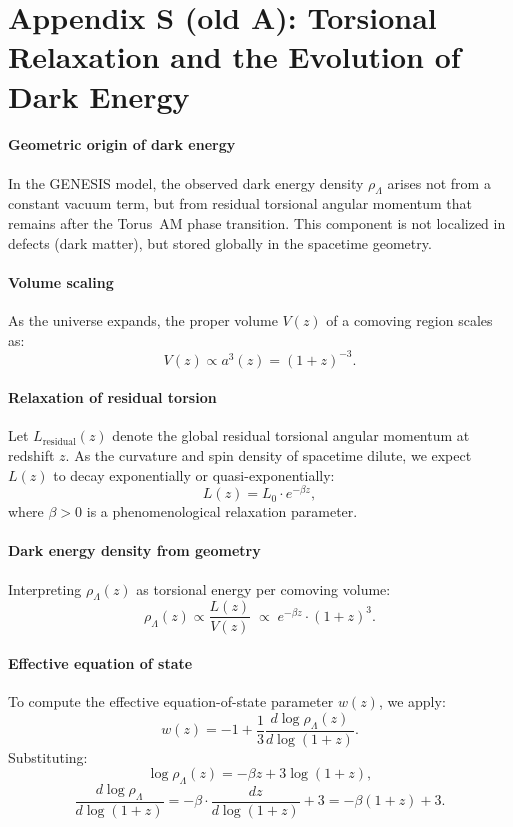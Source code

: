 \documentclass{article}
\begin{document}
\section*{Appendix S (old A): Torsional Relaxation and the Evolution of Dark Energy}
\label{app:torsion-relaxation}


\paragraph{Geometric origin of dark energy}
In the GENESIS model, the observed dark energy density $\rho_\Lambda$ arises not from a constant vacuum term, but from residual torsional angular momentum that remains after the Torus~AM phase transition. This component is not localized in defects (dark matter), but stored globally in the spacetime geometry.

\paragraph{Volume scaling}
As the universe expands, the proper volume $V(z)$ of a comoving region scales as:
\[
  V(z) \propto a^3(z) = (1 + z)^{-3}.
\]

\paragraph{Relaxation of residual torsion}
Let $L_{\text{residual}}(z)$ denote the global residual torsional angular momentum at redshift $z$. As the curvature and spin density of spacetime dilute, we expect $L(z)$ to decay exponentially or quasi-exponentially:
\[
  L(z) = L_0 \cdot e^{-\beta z},
\]
where $\beta > 0$ is a phenomenological relaxation parameter.

\paragraph{Dark energy density from geometry}
Interpreting $\rho_\Lambda(z)$ as torsional energy per comoving volume:
\[
  \rho_\Lambda(z)
  \propto
  \frac{L(z)}{V(z)} \;\propto\;
  e^{-\beta z}\cdot(1+z)^3.
\]

\paragraph{Effective equation of state}
To compute the effective equation-of-state parameter \( w(z) \), we apply:
\[
  w(z) = -1 + \frac{1}{3}\frac{d\log\rho_\Lambda(z)}{d\log(1+z)}.
\]
Substituting:
\[
  \log\rho_\Lambda(z)
  = -\beta z + 3\log(1+z),
\]
\[
  \frac{d\log\rho_\Lambda}{d\log(1+z)}
  = -\beta \cdot \frac{dz}{d\log(1+z)} + 3
  = -\beta (1+z) + 3.
\]
\end{document}
